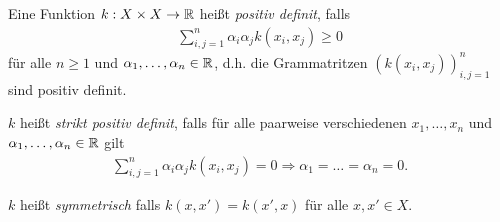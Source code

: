 \begin{defn}
\label{defn:5.1.10}
Eine Funktion $k: X\times X\to\mathbb{R}$ heißt \emph{positiv definit}, falls
\begin{align*}
\sum_{i,j=1}^n \alpha_i\alpha_j k(x_i,x_j) \ge 0
\end{align*}
für alle $n\ge 1$ und $\alpha_1,\ldots,\alpha_n\in\mathbb{R}$, d.h. die Grammatritzen
$(k(x_i,x_j))_{i,j=1}^n$ sind positiv definit.

$k$ heißt \emph{strikt positiv
definit}, falls für alle paarweise verschiedenen
$x_1,\ldots,x_n$ und $\alpha_1,\ldots,\alpha_n\in\mathbb{R}$ gilt
\begin{align*}
\sum_{i,j=1}^n \alpha_i\alpha_j k(x_i,x_j) = 0 \Rightarrow
\alpha_1=\ldots=\alpha_n = 0.
\end{align*}

$k$ heißt \emph{symmetrisch} falls $k(x,x')=k(x',x)$ für alle
$x,x'\in X$.\fishhere
\end{defn}

